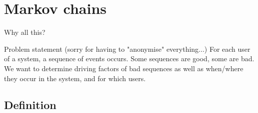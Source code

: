 \documentclass[10pt]{beamer}
\begin{document}
	
	\section{Markov chains}
	
	\begin{frame}{Why all this?}
	 \begin{block}{Problem statement (sorry for having to "anonymise" everything...)}
		For each user of a system, a sequence of events occurs. Some sequences are good, some are bad. We want to determine driving factors of bad sequences as well as when/where they occur in the system, and for which users.
	 \end{block}
	\end{frame}		
	
	\subsection{Definition}
\end{document}
